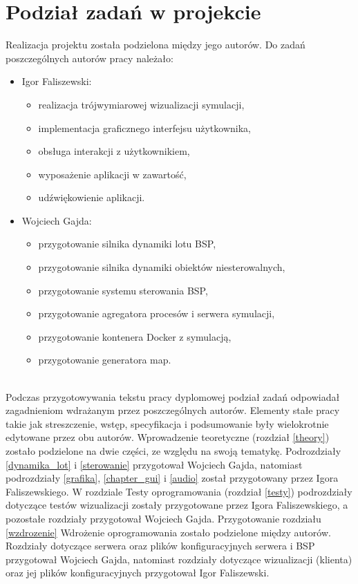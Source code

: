 \chapter*{Podział zadań w projekcie}

Realizacja projektu została podzielona między jego autorów. Do zadań poszczególnych autorów pracy należało:\\

\begin{itemize}
	\item Igor Faliszewski:
	\begin{itemize}[noitemsep,nolistsep]
		\item realizacja trójwymiarowej wizualizacji symulacji,
		\item implementacja graficznego interfejsu użytkownika,
		\item obsługa interakcji z użytkownikiem,
		\item wyposażenie aplikacji w zawartość,
		\item udźwiękowienie aplikacji.
	\end{itemize}
	\item Wojciech Gajda:
	\begin{itemize}[noitemsep,nolistsep]
		\item przygotowanie silnika dynamiki lotu BSP,
		\item przygotowanie silnika dynamiki obiektów niesterowalnych,
		\item przygotowanie systemu sterowania BSP,
		\item przygotowanie agregatora procesów i serwera symulacji,
		\item przygotowanie kontenera Docker z symulacją,
		\item przygotowanie generatora map.
	\end{itemize}
\end{itemize}
\ \\

Podczas przygotowywania tekstu pracy dyplomowej podział zadań odpowiadał zagadnieniom wdrażanym przez poszczególnych autorów. Elementy stałe pracy takie jak streszczenie, wstęp, specyfikacja i podsumowanie były wielokrotnie edytowane przez obu autorów. Wprowadzenie teoretyczne (rozdział \ref{theory}) zostało podzielone na dwie części, ze względu na swoją tematykę. Podrozdziały \ref{dynamika_lot} i \ref{sterowanie} przygotował Wojciech Gajda, natomiast podrozdziały \ref{grafika}, \ref{chapter_gui} i \ref{audio} został przygotowany przez Igora Faliszewskiego. W rozdziale Testy oprogramowania (rozdział \ref{testy}) podrozdziały dotyczące testów wizualizacji zostały przygotowane przez Igora Faliszewskiego, a pozostałe rozdziały przygotował Wojciech Gajda. Przygotowanie rozdziału \ref{wzdrozenie} Wdrożenie oprogramowania  zostało podzielone między autorów. Rozdziały dotyczące serwera oraz plików konfiguracyjnych serwera i BSP przygotował Wojciech Gajda, natomiast rozdziały dotyczące wizualizacji (klienta) oraz jej plików konfiguracyjnych przygotował Igor Faliszewski.

